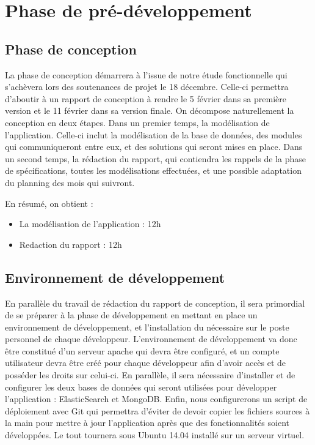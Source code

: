\section{Phase de pré-développement}
\label{sec:prep_dev}
    \subsection{Phase de conception}
    \label{subsec:conception}
        La phase de conception démarrera à l'issue de notre étude fonctionnelle qui s'achèvera lors des soutenances de projet le 18 décembre. Celle-ci permettra d'aboutir à un rapport de conception à rendre le 5 février dans sa première version et le 11 février dans sa version finale. On décompose naturellement la conception en deux étapes. Dans un premier temps, la modélisation de l'application. Celle-ci inclut la modélisation de la base de données, des modules qui communiqueront entre eux, et des solutions qui seront mises en place. Dans un second temps, la rédaction du rapport, qui contiendra les rappels de la phase de spécifications, toutes les modélisations effectuées, et une possible adaptation du planning des mois qui suivront.

        En résumé, on obtient :
        \begin{itemize}
            \item La modélisation de l'application : 12h
            \item Redaction du rapport : 12h
        \end{itemize}

    \subsection{Environnement de développement}
    \label{subsec:env_dev}
        En parallèle du travail de rédaction du rapport de conception, il sera primordial de se préparer à la phase de développement en mettant en place un environnement de développement, et l'installation du nécessaire sur le poste personnel de chaque développeur. L'environnement de développement va donc être constitué d'un serveur apache qui devra être configuré, et un compte utilisateur devra être créé pour chaque développeur afin d'avoir accès et de posséder les droits sur celui-ci. En parallèle, il sera nécessaire d'installer et de configurer les deux bases de données qui seront utilisées pour développer l'application : ElasticSearch et MongoDB. Enfin, nous configurerons un script de déploiement avec Git qui permettra d'éviter de devoir copier les fichiers sources à la main pour mettre à jour l'application après que des fonctionnalités soient développées. Le tout tournera sous Ubuntu 14.04 installé sur un serveur virtuel.

